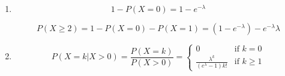 \begin{enumerate}[label=(\alph*)]
\item $$1 - P(X = 0) = 1 - e^{-\lambda}$$

$$P(X \geq 2) = 1 - P(X = 0) - P(X = 1) = (1 - e^{-\lambda}) - e^
{-\lambda}\lambda$$

\item $$P(X = k | X > 0) = \frac{P(X = k)}{P(X > 0)} = \begin{cases}
    0 & \text{if } k = 0 \\
    \frac{\lambda^{k}}{(e^{\lambda} - 1)k!} & \text{if } k \geq 1
\end{cases}$$

\end{enumerate}